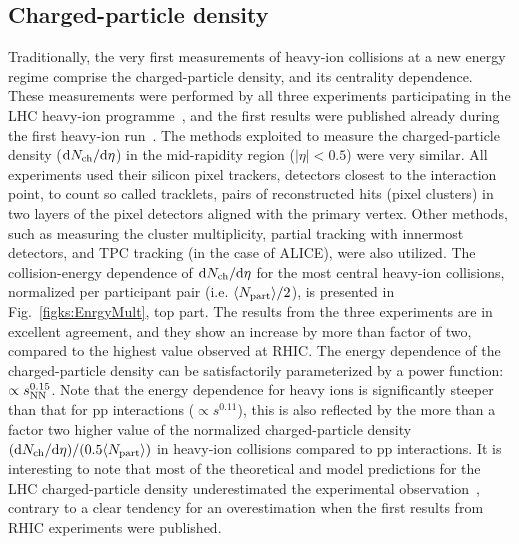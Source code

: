 \subsection{Charged-particle density}
\label{subsecks:partdensity}
Traditionally, the very first measurements of heavy-ion collisions at a new energy regime comprise the charged-particle density, and its centrality dependence. These measurements were performed by all three experiments participating in the LHC heavy-ion programme~\cite{Aamodt:2010pb,Aamodt:2010cz,ATLAS:2011ag,Chatrchyan:2011pb}, and the first results were published already during the first heavy-ion run~\cite{Aamodt:2010pb}. The methods exploited to measure the charged-particle density (${\rm d}N_{\rm ch}/{\rm d}\eta$) in the mid-rapidity region ($|\eta| < 0.5$) were very similar. All experiments used their silicon pixel trackers, detectors closest to the interaction point, to count so called tracklets, pairs of reconstructed hits (pixel clusters) in two layers of the pixel detectors aligned with the primary vertex. Other methods, such as measuring the cluster multiplicity, partial tracking with innermost detectors, and TPC tracking (in the case of ALICE), were also utilized. The collision-energy dependence of ${\rm d}N_{\rm ch}/{\rm d}\eta$ for the most central heavy-ion collisions, normalized per participant pair (i.e. $\langle N_{\rm part} \rangle /2$), is presented in Fig.~\ref{figks:EnrgyMult}, top part. The results from the three experiments are in excellent agreement, and they show an increase by more than factor of two, compared to the highest value observed at RHIC. The energy dependence of the charged-particle density can be satisfactorily parameterized by a power function: $\propto s_{\rm NN}^{0.15}$. Note that the energy dependence for heavy ions is significantly steeper than that for pp interactions ($\propto s^{0.11}$), this is also reflected by the more than a factor two higher value of the normalized charged-particle density $({\rm d}N_{\rm ch}/{\rm d}\eta)/(0.5\langle N_{\rm part} \rangle)$ in heavy-ion collisions compared to pp interactions. It is interesting to note that most of the theoretical and model predictions for the LHC charged-particle density underestimated the experimental observation~\cite{Aamodt:2010pb}, contrary to a clear tendency for an overestimation when the first results from RHIC experiments were published.

